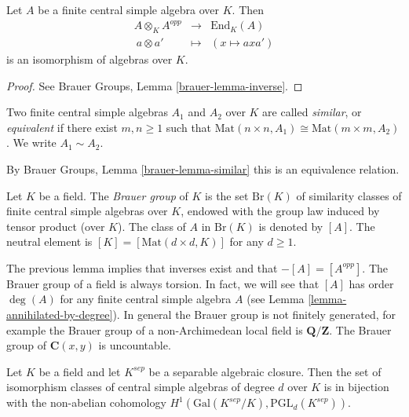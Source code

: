 \begin{lemma}
\label{lemma-brauer-inverse}
Let $A$ be a finite central simple algebra over $K$. Then
$$
\begin{matrix}
A \otimes_K A^{opp} & \longrightarrow & \text{End}_K(A) \\
\ a \otimes a' & \longmapsto & (x \mapsto a x a')
\end{matrix}
$$
is an isomorphism of algebras over $K$.
\end{lemma}

\begin{proof}
See
Brauer Groups, Lemma \ref{brauer-lemma-inverse}.
\end{proof}

\begin{definition}
\label{definition-brauer-equivalent}
Two finite central simple algebras $A_1$ and $A_2$ over $K$ are called
{\it similar}, or {\it equivalent} if there exist $m, n \geq 1$
such that $\text{Mat}(n \times n, A_1)
\cong \text{Mat}(m \times m, A_2)$. We write $A_1 \sim A_2$.
\end{definition}

\noindent
By Brauer Groups, Lemma \ref{brauer-lemma-similar} this is an
equivalence relation.

\begin{definition}
\label{definition-brauer-group}
Let $K$ be a field. The {\it Brauer group} of $K$ is the set $\text{Br} (K)$
of similarity classes of finite central simple algebras over $K$, endowed with
the group law induced by tensor product (over $K$). The class of $A$ in
$\text{Br}(K)$ is denoted by $[A]$. The neutral element is
$[K] = [\text{Mat}(d \times d, K)]$ for any $d \geq 1$.
\end{definition}

\noindent
The previous lemma implies that inverses exist and that $-[A] = [A^{opp}]$.
The Brauer group of a field is always torsion.
In fact, we will see that $[A]$ has order $\deg(A)$
for any finite central simple algebra $A$ (see
Lemma \ref{lemma-annihilated-by-degree}).
In general the Brauer group is not finitely generated, for example
the Brauer group of a non-Archimedean local field is $\mathbf{Q}/\mathbf{Z}$.
The Brauer group of $\mathbf{C}(x, y)$ is uncountable.

\begin{lemma}
\label{lemma-central-simple-algebra-pgln}
Let $K$ be a field and let $K^{sep}$ be a separable algebraic closure.
Then the set of isomorphism classes of central simple algebras of degree
$d$ over $K$ is in bijection with the non-abelian cohomology
$H^1(\text{Gal}(K^{sep}/K), \text{PGL}_d(K^{sep}))$.
\end{lemma}

